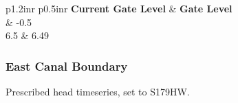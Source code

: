 \footnotesize
\begin{table}[!h]
\centering
\caption{Control strategy 2 for S167 close (units are ft. NGVD29)}
\label{tab:CS-S167close2}
\begin{tabular}{p{1.2in}{r} p{0.5in}{r}}
\hline
\textbf{Current Gate Level} & \textbf{Gate Level}\\
	& -0.5       \\
6.5	& 6.49   \\
\hline
\end{tabular}
\end{table}
\normalsize

%
%


\clearpage
\subsubsection{East Canal Boundary}
Prescribed head timeseries, set to S179HW.

